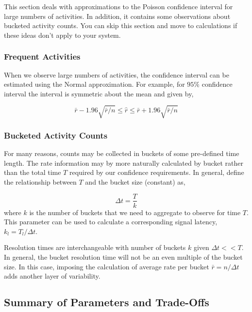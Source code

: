 \documentclass{article}
\begin{document}
This section deals with approximations to the Poisson confidence interval for large numbers of activities. In
addition, it contains some observations about bucketed activity counts. You can skip this section and
move to calculations if these ideas don't apply to your system.

\subsubsection{Frequent Activities} 

When we observe large numbers of activities, the confidence interval can be estimated using the Normal
approximation. For example, for $95\%$ confidence interval the interval is symmetric about the mean
and given by,

\begin{equation}
    \label{eq:largenconf}
    \bar{r} - 1.96 \sqrt{\bar{r}/n} \leq \hat{r} \leq \bar{r} + 1.96 \sqrt{\bar{r}/n}
\end{equation}

\subsubsection{Bucketed Activity Counts}

For many reasons, counts may be collected in buckets of some pre-defined time length.  The rate information
may by more naturally calculated by bucket rather than the total time $T$ required by our confidence
requirements. In general, define the relationship between $T$ and the bucket size (constant) as,

\begin{equation}
    \label{eq:bucket}
    \Delta t = \frac{T}{k}
\end{equation}
where $k$ is the number of buckets that we need to aggregate to observe for time $T$. This parameter
can be used to calculate a corresponding signal latency, $k_l = T_l/\Delta t$.

Resolution times are interchangeable with number of buckets $k$ given $\Delta t << T$.  In general, the
bucket resolution time will not be an even multiple of the bucket size.  In this case, imposing the calculation
of average rate per bucket $\bar{r} = n/\Delta t$ adds another layer of variability.

\subsection{Summary of Parameters and Trade-Offs}
\label{tradoffs}
\end{document}
